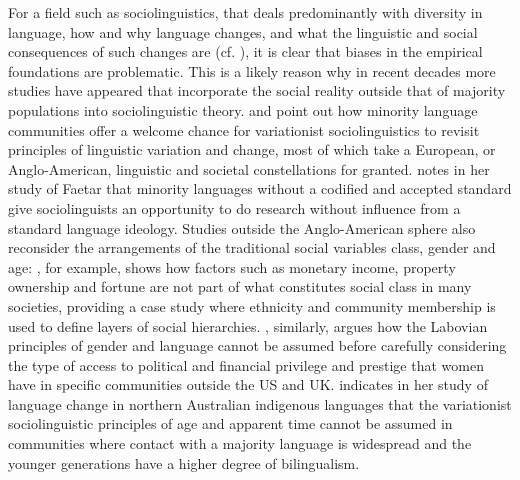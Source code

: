 \documentclass[output=paper,hidelinks]{langscibook}
\begin{document}
For a field such as sociolinguistics, that deals predominantly with diversity in language, how and why language changes, and what the linguistic and social consequences of such changes are (cf. \citealt{weinreich1968empirical}), it is clear that biases in the empirical foundations are problematic. This is a likely reason why in recent decades more studies have appeared that incorporate the social reality outside that of majority populations into sociolinguistic theory. \citet{Stanford2009} and \citet{Stanford2016} point out how minority language communities offer a welcome chance for variationist sociolinguistics to revisit principles of linguistic variation and change, most of which take a European, or Anglo-American, linguistic and societal constellations for granted. \citet[400]{nagy2009challenges} notes in her study of Faetar that minority languages without a codified and accepted standard give sociolinguists an opportunity to do research without influence from a standard language ideology. Studies outside the Anglo-American sphere also reconsider the arrangements of the traditional social variables class, gender and age: \citet{noglo2009sociophonetic}, for example, shows how factors such as monetary income, property ownership and fortune are not part of what constitutes social class in many societies, providing a case study where ethnicity and community membership is used to define layers of social hierarchies. \citet{brunelle2009diglossia}, similarly, argues how the Labovian principles of gender and language cannot be assumed before carefully considering the type of access to political and financial privilege and prestige that women have in specific communities outside the US and UK. \citet{o2009language} indicates in her study of language change in northern Australian indigenous languages that the variationist sociolinguistic principles of age and apparent time cannot be assumed in communities where contact with a majority language is widespread and the younger generations have a higher degree of bilingualism.
\end{document}
